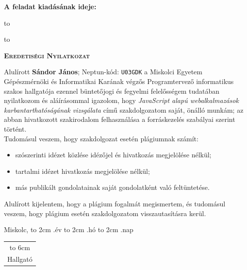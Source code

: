 \noindent\textbf{A feladat kiadásának ideje:}\newline


\vskip 2cm

\hbox to 

\hbox to 

\newpage

\vspace*{1cm}  
\begin{center}
\large\textsc{\bfseries Eredetiségi Nyilatkozat}
\end{center}
\vspace*{2cm}  

Alulírott \textbf{Sándor János}; Neptun-kód: \texttt{U03GDK} a Miskolci Egyetem Gépészmérnöki és Informatikai Karának végzős Programtervező informatikus szakos hallgatója ezennel büntetőjogi és fegyelmi felelősségem tudatában nyilatkozom és aláírásommal igazolom, hogy \textit{JavaScript alapú webalkalmazások karbantarthatóságának vizsgálata}
című szakdolgozatom saját, önálló munkám; az abban hivatkozott szakirodalom
felhasználása a forráskezelés szabályai szerint történt.\\

Tudomásul veszem, hogy szakdolgozat esetén plágiumnak számít:
\begin{itemize}
\item szószerinti idézet közlése idézőjel és hivatkozás megjelölése nélkül;
\item tartalmi idézet hivatkozás megjelölése nélkül;
\item más publikált gondolatainak saját gondolatként való feltüntetése.
\end{itemize}

Alulírott kijelentem, hogy a plágium fogalmát megismertem, és tudomásul veszem, hogy
plágium esetén szakdolgozatom visszautasításra kerül.

\vspace*{3cm}

\noindent Miskolc, \hbox to 2cm{\dotfill} .év \hbox to 2cm{\dotfill} .hó \hbox to 2cm{\dotfill} .nap

\vspace*{3cm}

\hspace*{8cm}\begin{tabular}{c}
\hbox to 6cm{\dotfill}\\
Hallgató
\end{tabular}



